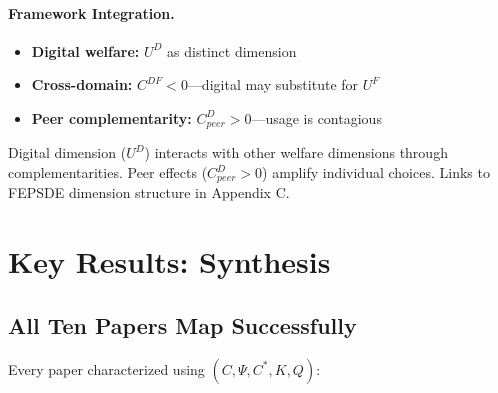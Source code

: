 \paragraph{Framework Integration.}
\begin{itemize}
  \item \textbf{Digital welfare:} $U^D$ as distinct dimension
  \item \textbf{Cross-domain:} $C^{DF} < 0$---digital may substitute for $U^F$
  \item \textbf{Peer complementarity:} $C^{D}_{peer} > 0$---usage is contagious
\end{itemize}

\begin{tcolorbox}[colback=yellow!5!white, colframe=yellow!75!black,
    title=EBF Insight: Digital Behavior]
Digital dimension ($U^D$) interacts with other welfare dimensions through
complementarities. Peer effects ($C^D_{peer} > 0$) amplify individual choices.
Links to FEPSDE dimension structure in Appendix C.
\end{tcolorbox}


\section{Key Results: Synthesis}
\label{sec:J-results}

\subsection{All Ten Papers Map Successfully}

Every paper characterized using $(C, \Psi, C^*, K, Q)$:


